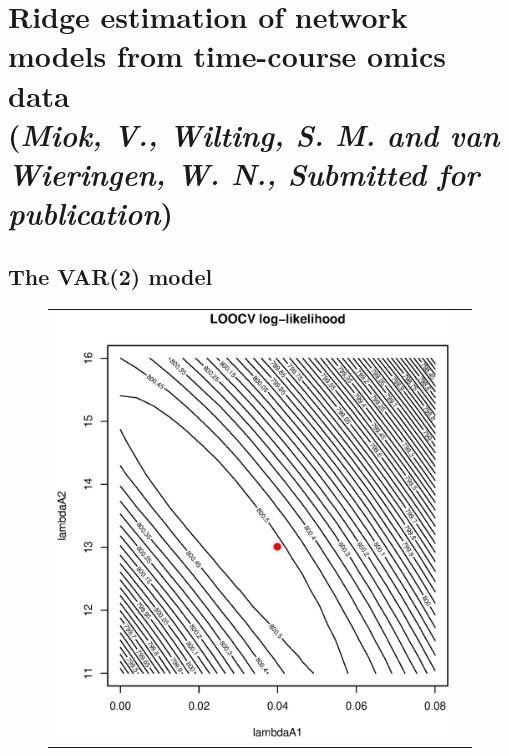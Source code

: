 \chapter{Ridge estimation of network models from time-course omics data \\ {\footnotesize(\textit{Miok, V., Wilting, S. M. and van Wieringen, W. N., Submitted for publication})}}
\label{chapter:Window estimator}

\graphicspath{{Chapter4/Figs/}{Chapter4/Figs/PDF/}{Chapter4/Figs/}}%


\section{The VAR(2) model}
\begin{figure}[h!]
\centering
\begin{tabular}{cc}
\includegraphics[scale=0.35]{Figure_5a.eps}

\end{tabular}
\end{figure}
